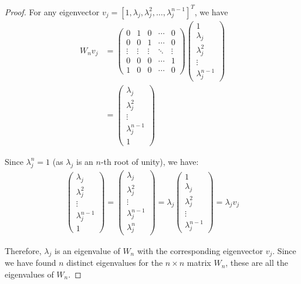 \begin{proof}
For any eigenvector $v_j = [1, \lambda_j, \lambda_j^2, \ldots, \lambda_j^{n-1}]^T$, we have
\begin{align}
W_n v_j &= \begin{pmatrix}
0 & 1 & 0 & \cdots & 0 \\
0 & 0 & 1 & \cdots & 0 \\
\vdots & \vdots & \vdots & \ddots & \vdots \\
0 & 0 & 0 & \cdots & 1 \\
1 & 0 & 0 & \cdots & 0
\end{pmatrix}
\begin{pmatrix}
1 \\
\lambda_j \\
\lambda_j^2 \\
\vdots \\
\lambda_j^{n-1}
\end{pmatrix} \\
&= \begin{pmatrix}
\lambda_j \\
\lambda_j^2 \\
\vdots \\
\lambda_j^{n-1} \\
1
\end{pmatrix}
\end{align}

Since $\lambda_j^n = 1$ (as $\lambda_j$ is an $n$-th root of unity), we have:
\begin{align}
\begin{pmatrix}
\lambda_j \\
\lambda_j^2 \\
\vdots \\
\lambda_j^{n-1} \\
1
\end{pmatrix} = 
\begin{pmatrix}
\lambda_j \\
\lambda_j^2 \\
\vdots \\
\lambda_j^{n-1} \\
\lambda_j^n
\end{pmatrix} = 
\lambda_j \begin{pmatrix}
1 \\
\lambda_j \\
\lambda_j^2 \\
\vdots \\
\lambda_j^{n-1}
\end{pmatrix} = \lambda_j v_j
\end{align}

Therefore, $\lambda_j$ is an eigenvalue of $W_n$ with the corresponding eigenvector $v_j$. Since we have found $n$ distinct eigenvalues for the $n \times n$ matrix $W_n$, these are all the eigenvalues of $W_n$.
\end{proof}

